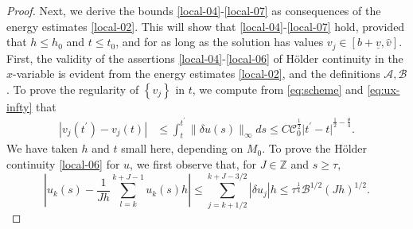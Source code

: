 \documentclass[a4paper,oneside,11pt]{article}
\numberwithin{equation}{section}
\begin{document}
\begin{proof}
Next, we derive the bounds \eqref{local-04}-\eqref{local-07} as consequences of the energy estimates \eqref{local-02}. This will show that \eqref{local-04}-\eqref{local-07} hold, provided that \(h\leq h_{0}\) and \(t\leq t_0\), and for as long as the solution has values \(v_{j} \in [b+\underline{v}, \hat{v}]\). 
First, the validity of the assertions \eqref{local-04}-\eqref{local-06} of H\"{o}lder continuity in the \(x\)-variable is evident from the energy estimates \eqref{local-02}, and the definitions \(\mathscr{A},\mathscr{B}\). To prove the regularity of \(\left\{{v}_{j}\right\}\) in \(t\), we compute from \eqref{eq:scheme} and \eqref{eq:ux-infty} that
\begin{equation}\label{eq256}
	\begin{aligned}
\left| {{v}_{j}\left( {t}^{\prime }\right)  - {v}_{j}(t) }\right|  &\leq  \int_{t}^{{t}^{\prime }}\parallel {\delta u}\left( s\right) {\parallel }_{\infty }{ds}
\leq  C \mathscr{C}_{0}^{\frac{1}{2}}{\big| {t}^{\prime } - t\big| }^{\frac{1}{2} - \frac{\theta }{4}}.
	\end{aligned}	
\end{equation}
We have taken \(h\) and \(t\) small here, depending on \({M}_{0}\).
To prove the H\"{o}lder continuity \eqref{local-06} for $u$, we first observe that, for \(J \in  \mathbb{Z}\) and \(s \geq  \tau\),
\[
\left| {u_k(s)  - \frac{1}{Jh}\mathop{\sum }\limits_{{l = k}}^{{k + J - 1}}{u}_{k}\left( s\right) h}\right|  \leq  \mathop{\sum }\limits_{{j = k + 1/2}}^{{k + J - 3/2}}\left| {\delta {u}_{j}}\right| h \leq  \tau^{\frac14}\mathscr{B}^{1/2}(Jh)^{1/2}.
\]
\end{proof}
\end{document}
